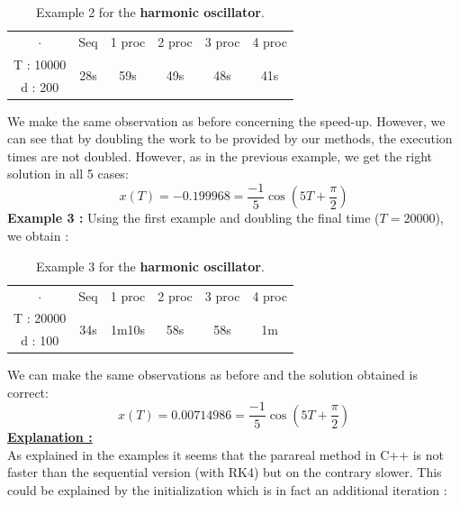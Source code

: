 \begin{enumerate}[label=\textbullet]
\begin{itemize}[label=-]
\begin{table}[H]
\begin{tabular}{| c || c | c | c | c | c |}
				\hline
				\multirow{2}{1.5 cm}{$\cdot$} & \multirow{2}{1.5 cm}{Seq} & \multirow{2}{1.5 cm}{1 proc} & \multirow{2}{1.5 cm}{2 proc} & \multirow{2}{1.5 cm}{3 proc} &\multirow{2}{1.5 cm}{4 proc} \\
				& & & & & \\
				\hline 
				T : 10000 & \multirow{2}{1.5 cm}{28s} & \multirow{2}{1.5 cm}{59s} & \multirow{2}{1.5 cm}{49s} & \multirow{2}{1.5 cm}{48s} & \multirow{2}{1.5 cm}{41s} \\
				d : 200 & & & & & \\
				\hline 
			\end{tabular}
			\caption{Example 2 for the \textbf{harmonic oscillator}.}
			\label{time}
		\end{table}
		We make the same observation as before concerning the speed-up. However, we can see that by doubling the work to be provided by our methods, the execution times are not doubled. However, as in the previous example, we get the right solution in all 5 cases:
		$$x(T)=-0.199968=\frac{-1}{5}\cos\left(5T+\frac{\pi}{2}\right)$$
		\textbf{Example 3 :} Using the first example and doubling the final time ($T=20000$), we obtain :
		\begin{table}[H]
			\centering
			\begin{tabular}{| c || c | c | c | c | c |}
				\hline
				\multirow{2}{1.5 cm}{$\cdot$} & \multirow{2}{1.5 cm}{Seq} & \multirow{2}{1.5 cm}{1 proc} & \multirow{2}{1.5 cm}{2 proc} & \multirow{2}{1.5 cm}{3 proc} &\multirow{2}{1.5 cm}{4 proc} \\
				& & & & & \\
				\hline 
				T : 20000 & \multirow{2}{1.5 cm}{34s} & \multirow{2}{1.5 cm}{1m10s} & \multirow{2}{1.5 cm}{58s} & \multirow{2}{1.5 cm}{58s} & \multirow{2}{1.5 cm}{1m} \\
				d : 100 & & & & & \\
				\hline 
			\end{tabular}
			\caption{Example 3 for the \textbf{harmonic oscillator}.}
			\label{time_osc_3}
		\end{table}
		We can make the same observations as before and the solution obtained is correct:
		$$x(T)=0.00714986=\frac{-1}{5}\cos\left(5T+\frac{\pi}{2}\right)$$
		\underline{\textbf{Explanation :}} \\
		As explained in the examples it seems that the parareal method in C++ is not faster than the sequential version (with RK4) but on the contrary slower. This could be explained by the initialization which is in fact an additional iteration :

\end{itemize}
\end{enumerate}

